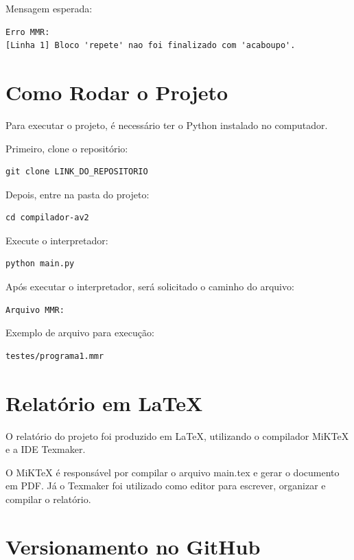 \documentclass[12pt,a4paper]{article}
\begin{document}
Mensagem esperada:

\begin{lstlisting}
Erro MMR:
[Linha 1] Bloco 'repete' nao foi finalizado com 'acaboupo'.
\end{lstlisting}

\section{Como Rodar o Projeto}

Para executar o projeto, é necessário ter o Python instalado no computador.

Primeiro, clone o repositório:

\begin{lstlisting}
git clone LINK_DO_REPOSITORIO
\end{lstlisting}

Depois, entre na pasta do projeto:

\begin{lstlisting}
cd compilador-av2
\end{lstlisting}

Execute o interpretador:

\begin{lstlisting}
python main.py
\end{lstlisting}

Após executar o interpretador, será solicitado o caminho do arquivo:

\begin{lstlisting}
Arquivo MMR:
\end{lstlisting}

Exemplo de arquivo para execução:

\begin{lstlisting}
testes/programa1.mmr
\end{lstlisting}

\section{Relatório em LaTeX}

O relatório do projeto foi produzido em LaTeX, utilizando o compilador MiKTeX e a IDE Texmaker.

O MiKTeX é responsável por compilar o arquivo main.tex e gerar o documento em PDF. Já o Texmaker foi utilizado como editor para escrever, organizar e compilar o relatório.

\section{Versionamento no GitHub}
\end{document}
